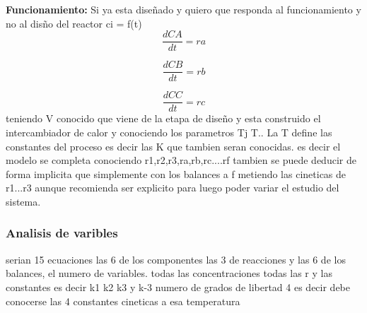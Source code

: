 \documentclass{report}
\begin{document}
\begin{raggedright}
	\textbf{Funcionamiento:}
Si ya esta diseñado y quiero que responda al funcionamiento y no al disño del reactor ci = f(t)
\begin{equation}
	\frac{dCA}{dt} = ra
\end{equation}

\begin{equation}
	\frac{dCB}{dt} = rb
\end{equation}

\begin{equation}
	\frac{dCC}{dt} = rc
\end{equation}
teniendo V conocido que viene de la etapa de diseño y esta construido el intercambiador de calor y conociendo los parametros Tj T..
La T define las constantes del proceso es decir las K que tambien seran conocidas.
es decir el modelo se completa conociendo r1,r2,r3,ra,rb,rc....rf tambien se puede deducir de forma implicita que simplemente con
los balances a f metiendo las cineticas de r1...r3 aunque recomienda ser explicito para luego poder variar el estudio del sistema.
\subsubsection{Analisis de varibles}
serian 15 ecuaciones las 6 de los componentes las 3 de reacciones y las 6 de los balances, el numero de variables. todas las concentraciones
todas las r y las constantes es decir k1 k2 k3 y k-3 
numero de grados de libertad 4 es decir debe conocerse las 4 constantes cineticas a esa temperatura

\end{raggedright}

\end{document}
